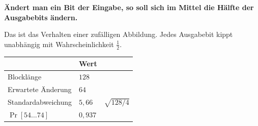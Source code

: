 \begin{merksatz}
\begin{center}
\begin{minipage}{0.9\textwidth}
\textbf{Ändert man ein Bit der Eingabe, so soll sich im Mittel die Hälfte der Ausgabebits ändern.}
\end{minipage}
\end{center}

Das ist das Verhalten einer zufälligen Abbildung. Jedes Ausgabebit kippt unabhängig mit Wahrscheinlichkeit $\frac12$.

\begin{center}
{\small
\renewcommand{\arraystretch}{1.48}
\begin{tabular}{@{}P{3.4cm}P{1.8cm}P{2.4cm}@{}}
\toprule
& \textbf{Wert} & \\
\midrule
Blocklänge & $128$ & \\
Erwartete Änderung & $64$ & \\
Standard\-abweichung & $5{,}66$ & $\sqrt{128/4}$\\
$\Pr[54\ldots74]$ & $0{,}937$ & \\
\bottomrule
\end{tabular}}
\end{center}

\begin{center}
\begin{minipage}{0.88\textwidth}
\end{minipage}
\end{center}
\end{merksatz}

